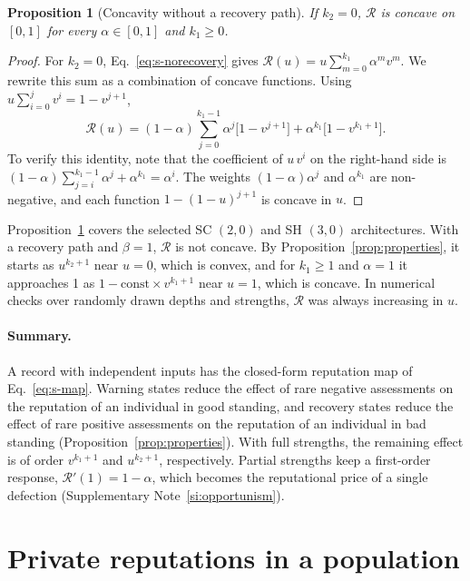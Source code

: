 \documentclass[10pt]{wlscirep}
\newcommand{\Rmap}{\mathscr{R}}            %
\theoremstyle{plain}
\newtheorem{proposition}[lemma]{Proposition}
\theoremstyle{remark}
\begin{document}
\begin{proposition}[Concavity without a recovery path]\label{prop:concave}
If $k_2=0$, $\Rmap$ is concave on $[0,1]$ for every $\alpha\in[0,1]$ and $k_1\geq0$.
\end{proposition}
\begin{proof}
For $k_2=0$, Eq.~\eqref{eq:s-norecovery} gives $\Rmap(u)=u\sum_{m=0}^{k_1}\alpha^mv^m$. We rewrite this sum as a combination of concave functions. Using $u\sum_{i=0}^{j}v^i=1-v^{j+1}$,
\begin{equation}
\Rmap(u)=(1-\alpha)\sum_{j=0}^{k_1-1}\alpha^j\bigl[1-v^{j+1}\bigr]+\alpha^{k_1}\bigl[1-v^{k_1+1}\bigr].
\label{eq:s-concave}
\end{equation}
To verify this identity, note that the coefficient of $u\,v^i$ on the right-hand side is $(1-\alpha)\sum_{j=i}^{k_1-1}\alpha^j+\alpha^{k_1}=\alpha^i$. The weights $(1-\alpha)\alpha^j$ and $\alpha^{k_1}$ are non-negative, and each function $1-(1-u)^{j+1}$ is concave in $u$.
\end{proof}

Proposition~\ref{prop:concave} covers the selected SC $(2,0)$ and SH $(3,0)$ architectures. With a recovery path and $\beta=1$, $\Rmap$ is not concave. By Proposition~\ref{prop:properties}, it starts as $u^{k_2+1}$ near $u=0$, which is convex, and for $k_1\geq1$ and $\alpha=1$ it approaches 1 as $1-\mathrm{const}\times v^{k_1+1}$ near $u=1$, which is concave. In numerical checks over randomly drawn depths and strengths, $\Rmap$ was always increasing in $u$.

\paragraph{Summary.} A record with independent inputs has the closed-form reputation map of Eq.~\eqref{eq:s-map}. Warning states reduce the effect of rare negative assessments on the reputation of an individual in good standing, and recovery states reduce the effect of rare positive assessments on the reputation of an individual in bad standing (Proposition~\ref{prop:properties}). With full strengths, the remaining effect is of order $v^{k_1+1}$ and $u^{k_2+1}$, respectively. Partial strengths keep a first-order response, $\Rmap'(1)=1-\alpha$, which becomes the reputational price of a single defection (Supplementary Note~\ref{si:opportunism}).

\FloatBarrier
\section{Private reputations in a population}
\label{si:population}
\end{document}
